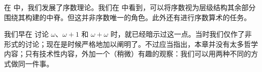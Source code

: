 \documentclass[../../../include/open-logic-section]{subfiles}
\begin{document}


在  中，我们发展了序数理论。我们在  中看到，可以将序数视为层级结构其余部分围绕其构建的中脊。但这并非序数唯一的角色。此外还有进行序数算术的任务。

我们早在  讨论 $\omega$、$\omega+1$ 和 $\omega+\omega$ 时，就已经暗示过这一点。当时我们仅作了非形式的讨论；现在是时候严格地加以阐明了。不过应当指出，本章并没有太多哲学内容；只有技术性内容，外加一个（稍微）有趣的观察：我们可以用两种不同的方式做同一件事。
\end{document}
